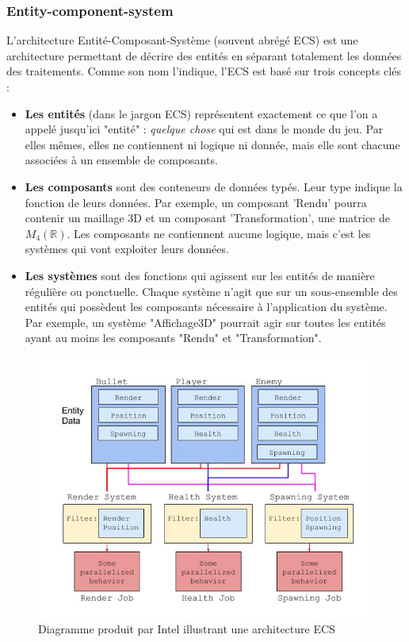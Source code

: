 \subsubsection{Entity-component-system}
    L'architecture Entité-Composant-Système (souvent abrégé ECS) est une architecture permettant de décrire des entités en séparant totalement les données des traitements. Comme son nom l'indique, l'ECS est basé sur trois concepts clés :

\begin{itemize}
    \item \textbf{Les entités} (dans le jargon ECS) représentent exactement ce que l'on a appelé jusqu'ici "entité" : \textit{quelque chose} qui est dans le monde du jeu. Par elles mêmes, elles ne contiennent ni logique ni donnée, mais elle sont chacune associées à un ensemble de composants.
    \item \textbf{Les composants} sont des conteneurs de données typés. Leur type indique la fonction de leurs données. Par exemple, un composant 'Rendu' pourra contenir un maillage 3D et un composant 'Transformation', une matrice de $M_4(\mathbb R)$. Les composants ne contiennent aucune logique, mais c'est les systèmes qui vont exploiter leurs données.
    \item \textbf{Les systèmes} sont des fonctions qui agissent sur les entités de manière régulière ou ponctuelle. Chaque système n'agit que sur un sous-ensemble des entités qui possèdent les composants nécessaire à l'application du système. Par exemple, un système "Affichage3D" pourrait agir sur toutes les entités ayant au moins les composants "Rendu" et "Transformation".
\end{itemize}

    \begin{figure}[!h]
        \centering
        \includegraphics[width=0.5\linewidth]{images/ecsDiagram.PNG}
        \caption{Diagramme produit par Intel illustrant une architecture ECS}
        \label{fig:enter-label}
    \end{figure}


